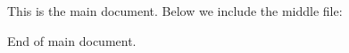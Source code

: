 \documentclass{article}
\begin{document}
This is the main document.
Below we include the middle file:



End of main document.
\end{document}
